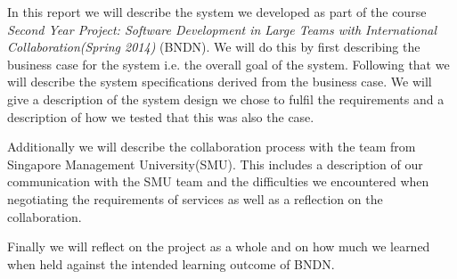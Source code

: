\documentclass[../report.tex]{subfiles}
\begin{document}
In this report we will describe the system we developed as part of the course \textit{Second Year Project: Software Development in Large Teams with International Collaboration(Spring 2014)} (BNDN). We will do this by first describing the business case for the system i.e. the overall goal of the system. Following that we will describe the system specifications derived from the business case. We will give a description of the system design we chose to fulfil the requirements and a description of how we tested that this was also the case.

Additionally we will describe the collaboration process with the team from Singapore Management University(SMU). This includes a description of our communication with the SMU team and the difficulties we encountered when negotiating the requirements of services as well as a reflection on the collaboration.

Finally we will reflect on the project as a whole and on how much we learned when held against the intended learning outcome of BNDN.
\end{document}
